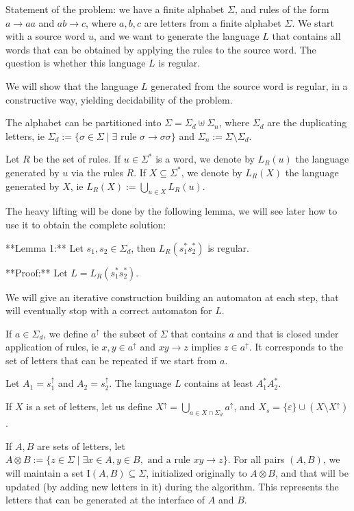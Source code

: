 \documentclass[12pt]{article}
\begin{document}
Statement of the problem: we have a finite alphabet $\Sigma$, and rules of the form $a\to aa$ and $ab\to c$, where $a,b,c$ are letters from a finite alphabet $\Sigma$. We start with a source word $u$, and we want to generate the language $L$ that contains all words that can be obtained by applying the rules to the source word. The question is whether this language $L$ is regular.


We will show that the language $L$ generated from the source word is regular, in a constructive way, yielding decidability of the problem. 

The alphabet can be partitioned into $\Sigma=\Sigma_d\uplus\Sigma_n$, where $\Sigma_d$ are the duplicating letters, ie $\Sigma_d:=\{\sigma\in \Sigma\mid\exists\text{ rule }\sigma\to\sigma\sigma\}$ and $\Sigma_n:=\Sigma\setminus\Sigma_d$.

Let $R$ be the set of rules. If $u\in\Sigma^*$ is a word, we denote by  $L_R(u)$ the language generated by $u$ via the rules $R$. If $X\subseteq\Sigma^*$, we denote by $L_R(X)$ the language generated by $X$, ie $L_R(X):=\bigcup_{u\in X}L_R(u)$.

The heavy lifting will be done by the following lemma, we will see later how to use it to obtain the complete solution:

**Lemma 1:** Let $s_1,s_2\in\Sigma_d$, then $L_R(s_1^*s_2^*)$ is regular.


**Proof:**
Let $L=L_R(s_1^*s_2^*)$. 

We will give an iterative construction building an automaton at each step, that will eventually stop with a correct automaton for $L$.

If $a\in\Sigma_d$, we define $a^\uparrow$ the subset of $\Sigma$ that contains $a$ and that is closed under application of rules, ie $x,y\in a^\uparrow$ and $xy\to z$ implies $z\in a^\uparrow$. It corresponds to the set of letters that can be repeated if we start from $a$.

Let $A_1=s_1^\uparrow$ and $A_2=s_2^\uparrow$. The language $L$ contains at least $A_1^*A_2^*$.

If $X$ is a set of letters, let us define $X^\uparrow=\bigcup_{a\in X\cap\Sigma_d} a^\uparrow$, and $X_s=\{\varepsilon\}\cup (X\setminus X^\uparrow)$.

If $A,B$ are sets of letters, let $A\otimes B:=\{z\in\Sigma\mid \exists x\in A,y\in B,\text{ and a rule } xy\to z\}$.
For all pairs $(A,B)$, we will maintain a set $\mathrm{I}(A,B)\subseteq\Sigma$, initialized originally to $A\otimes B$, and that will be updated (by adding new letters in it) during the algorithm. This represents the letters that can be generated at the interface of $A$ and $B$.
\end{document}
